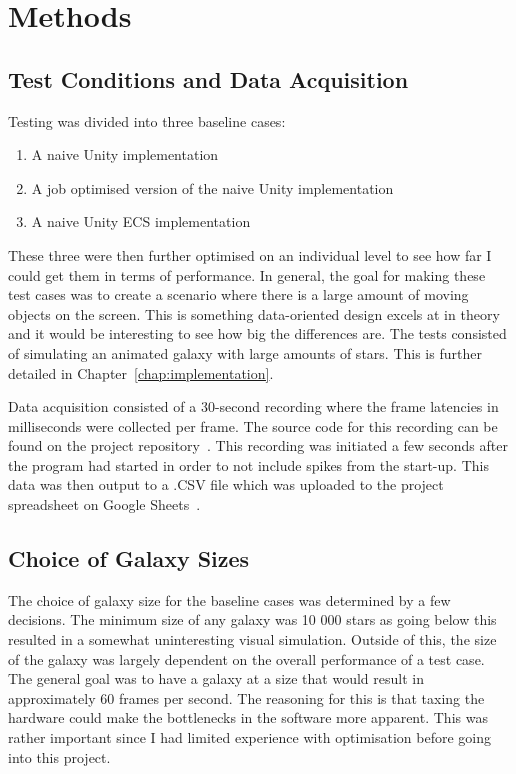 \chapter{Methods}\label{chap:methods}
\section{Test Conditions and Data Acquisition}
Testing was divided into three baseline cases:
\begin{enumerate}
    \item A naive Unity implementation
    \item A job optimised version of the naive Unity implementation
    \item A naive Unity ECS implementation
\end{enumerate}
These three were then further optimised on an individual level to see how far I could get them in terms of performance. In general, the goal for making these test cases was to create a scenario where there is a large amount of moving objects on the screen. This is something data-oriented design excels at in theory and it would be interesting to see how big the differences are. The tests consisted of simulating an animated galaxy with large amounts of stars. This is further detailed in Chapter~\ref{chap:implementation}.

Data acquisition consisted of a 30-second recording where the frame latencies in milliseconds were collected per frame. The source code for this recording can be found on the project repository~\cite{performanceMeasurer}. This recording was initiated a few seconds after the program had started in order to not include spikes from the start-up. This data was then output to a .CSV file which was uploaded to the project spreadsheet on Google Sheets~\cite{projectSpreadsheet}.

\section{Choice of Galaxy Sizes}
The choice of galaxy size for the baseline cases was determined by a few decisions. The minimum size of any galaxy was 10 000 stars as going below this resulted in a somewhat uninteresting visual simulation. Outside of this, the size of the galaxy was largely dependent on the overall performance of a test case. The general goal was to have a galaxy at a size that would result in approximately 60 frames per second. The reasoning for this is that taxing the hardware could make the bottlenecks in the software more apparent. This was rather important since I had limited experience with optimisation before going into this project.  


